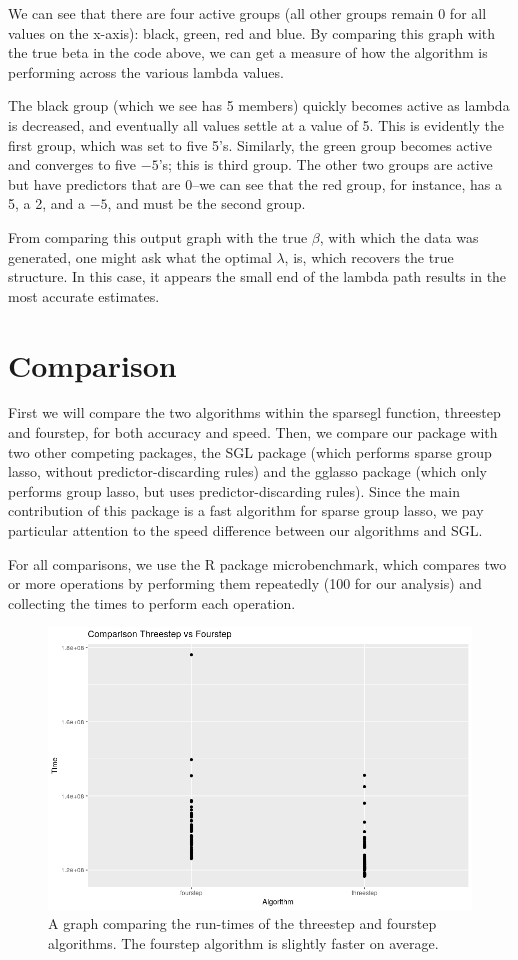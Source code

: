 \documentclass[titlepage]{article}
\begin{document}
We can see that there are four active groups (all other groups remain 0 for all values on the x-axis): black, green, red and blue. By comparing this graph with the true beta in the code above, we can get a measure of how the algorithm is performing across the various lambda values.

The black group (which we see has 5 members) quickly becomes active as lambda is decreased, and eventually all values settle at a value of 5. This is evidently the first group, which was set to five 5's. Similarly, the green group becomes active and converges to five $-5$'s; this is third group. The other two groups are active but have predictors that are 0--we can see that the red group, for instance, has a 5, a 2, and a $-5$, and must be the second group.

From comparing this output graph with the true $\beta$, with which the data was generated, one might ask what the optimal $\lambda$, is, which recovers the true structure. In this case, it appears the small end of the lambda path results in the most accurate estimates.


\section{Comparison}

First we will compare the two algorithms within the sparsegl function, threestep and fourstep, for both accuracy and speed. Then, we compare our package with two other competing packages, the SGL package (which performs sparse group lasso, without predictor-discarding rules) and the gglasso package (which only performs group lasso, but uses predictor-discarding rules). Since the main contribution of this package is a fast algorithm for sparse group lasso, we pay particular attention to the speed difference between our algorithms and SGL.

For all comparisons, we use the R package microbenchmark, which compares two or more operations by performing them repeatedly (100 for our analysis) and collecting the times to perform each operation.

\begin{figure}[tb!]
\centering
\includegraphics[scale=0.5]{threevsfour.png}
\caption{A graph comparing the run-times of the threestep and fourstep algorithms. The fourstep algorithm is slightly faster on average.}
\label{fig:threevsfour}
\end{figure}
\end{document}
